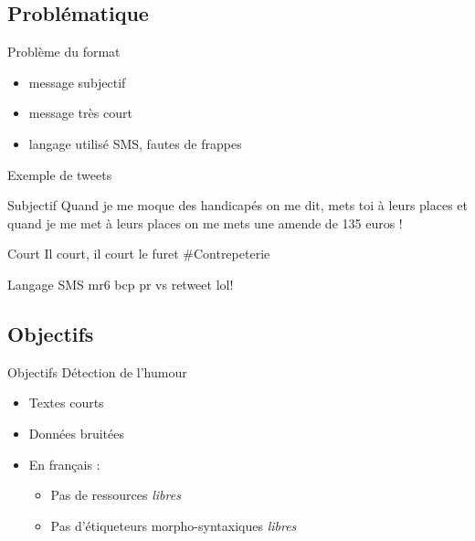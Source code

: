 \documentclass{beamer}
\begin{document}
\subsection{Problématique}
\begin{frame}{Problème du format}
	\begin{itemize}
		\item message subjectif
		\item message très court
		\item langage utilisé SMS, fautes de frappes
	\end{itemize}


\end{frame}



\begin{frame}{Exemple de tweets}
\begin{exampleblock}{Subjectif}
Quand je me moque des handicapés on me dit, mets toi à leurs places et quand je me met à leurs places on me mets une amende de 135 euros !
\end{exampleblock}
\begin{exampleblock}{Court}
Il court, il court le furet \#Contrepeterie
\end{exampleblock}
\begin{exampleblock}{Langage SMS}
mr6 bcp pr vs retweet lol!
\end{exampleblock}
\end{frame}

\subsection{Objectifs}
\begin{frame}{Objectifs}
Détection de l'humour

	
\begin{itemize}
\item Textes courts
\item Données bruitées
\item En français :
\begin{itemize}
\item Pas de ressources \textit{libres}
\item Pas d'étiqueteurs morpho-syntaxiques \textit{libres} 
\end{itemize}
\end{itemize}
\end{frame}
\end{document}
